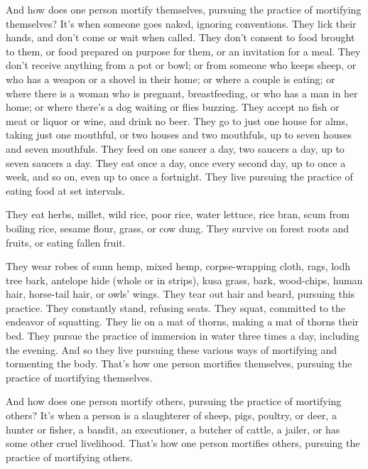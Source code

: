 \documentclass[12pt,openany]{book}%
\begin{document}
And how does one person mortify themselves, pursuing the practice of mortifying themselves? It’s when someone goes naked, ignoring conventions. They lick their hands, and don’t come or wait when called. They don’t consent to food brought to them, or food prepared on purpose for them, or an invitation for a meal. They don’t receive anything from a pot or bowl; or from someone who keeps sheep, or who has a weapon or a shovel in their home; or where a couple is eating; or where there is a woman who is pregnant, breastfeeding, or who has a man in her home; or where there’s a dog waiting or flies buzzing. They accept no fish or meat or liquor or wine, and drink no beer. They go to just one house for alms, taking just one mouthful, or two houses and two mouthfuls, up to seven houses and seven mouthfuls. They feed on one saucer a day, two saucers a day, up to seven saucers a day. They eat once a day, once every second day, up to once a week, and so on, even up to once a fortnight. They live pursuing the practice of eating food at set intervals. 

They eat herbs, millet, wild rice, poor rice, water lettuce, rice bran, scum from boiling rice, sesame flour, grass, or cow dung. They survive on forest roots and fruits, or eating fallen fruit. 

They wear robes of sunn hemp, mixed hemp, corpse-wrapping cloth, rags, lodh tree bark, antelope hide (whole or in strips), kusa grass, bark, wood-chips, human hair, horse-tail hair, or owls’ wings. They tear out hair and beard, pursuing this practice. They constantly stand, refusing seats. They squat, committed to the endeavor of squatting. They lie on a mat of thorns, making a mat of thorns their bed. They pursue the practice of immersion in water three times a day, including the evening. And so they live pursuing these various ways of mortifying and tormenting the body. That’s how one person mortifies themselves, pursuing the practice of mortifying themselves. 

And how does one person mortify others, pursuing the practice of mortifying others? It’s when a person is a slaughterer of sheep, pigs, poultry, or deer, a hunter or fisher, a bandit, an executioner, a butcher of cattle, a jailer, or has some other cruel livelihood. That’s how one person mortifies others, pursuing the practice of mortifying others. 
\end{document}
